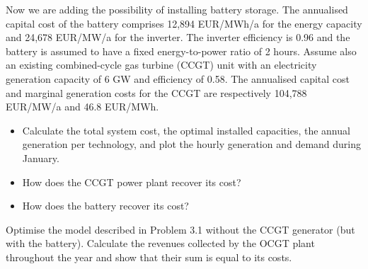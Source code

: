 \documentclass[10pt]{article}
\newenvironment{problem}[2][Problem]{\begin{trivlist}
\item[\hskip \labelsep {\bfseries #1}\hskip \labelsep {\bfseries #2.}]}{\end{trivlist}}
\begin{document}
\begin{problem}{3.1}
Now we are adding the possibility of installing battery storage. The annualised capital cost of the battery comprises 12,894 EUR/MWh/a for the energy capacity and 24,678 EUR/MW/a for the inverter. The inverter efficiency is 0.96 and the battery is assumed to have a fixed energy-to-power ratio of 2 hours. Assume also an existing combined-cycle gas turbine (CCGT) unit with an electricity generation capacity of 6 GW and efficiency of 0.58. The annualised capital cost and marginal generation costs for the CCGT are respectively 104,788 EUR/MW/a and 46.8 EUR/MWh.

\begin{itemize}
\item[c)] Calculate the total system cost, the optimal installed capacities, the annual generation per technology, and plot the hourly generation and demand during January.

\item[d)] How does the CCGT power plant recover its cost?

 \item[e)] How does the battery recover its cost?

\end{itemize}



\end{problem}

\begin{problem}{3.2}
	Optimise the model described in Problem 3.1 without the CCGT generator (but with the battery). Calculate the revenues collected by the OCGT plant throughout the year and show that their sum is equal to its costs.
	
\end{problem}


\end{document}
